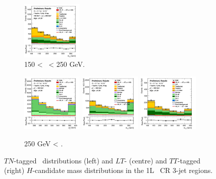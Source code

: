 \begin{figure}[h!]
\begin{subfigure}[b]{\textwidth}
        \includegraphics[width=0.32\textwidth]{Images/VH/Own_fit/postfit_VHcc/Region_distmBB_BMax250_BMin150_DCRHigh_J3_TTypett_T2_L1_Y6051_GlobalFit_conditionnal_mu1.png}
        \caption{150 < \ptv\ < 250 GeV.}
        \label{fig:plots_VHcc_1L_150_CRH_3J}
    \end{subfigure}
    \begin{subfigure}[b]{\textwidth}
        \centering
        \includegraphics[width=0.32\textwidth]{Images/VH/Own_fit/postfit_VHcc/Region_distpTV_BMin250_DCRHigh_J3_TTypent_T1_L1_Y6051_GlobalFit_conditionnal_mu1.png}
        \includegraphics[width=0.32\textwidth]{Images/VH/Own_fit/postfit_VHcc/Region_distmBB_BMin250_DCRHigh_J3_TTypelt_T2_L1_Y6051_GlobalFit_conditionnal_mu1.png}
        \includegraphics[width=0.32\textwidth]{Images/VH/Own_fit/postfit_VHcc/Region_distmBB_BMin250_DCRHigh_J3_TTypett_T2_L1_Y6051_GlobalFit_conditionnal_mu1.png}
        \caption{250 GeV < \ptv.}
        \label{fig:plots_VHcc_1L_250_CRH_3J}
    \end{subfigure}
    \caption{$TN$-tagged \ptv\ distributions (left) and $LT$- (centre) and $TT$-tagged (right) $H$-candidate mass distributions in the 1L \highdr\ CR 3-jet regions.}
    \label{fig:plots_VHcc_1L_CRH_3J}
\end{figure}

